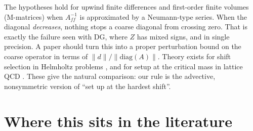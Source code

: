 \documentclass[11pt,a4paper]{article}
\newcommand{\Aff}{A_{ff}}
\begin{document}
\smallskip
The hypotheses hold for upwind finite differences and first-order finite volumes (M-matrices) when $\Aff^{-1}$ is approximated by a Neumann-type series. When the diagonal \emph{decreases}, nothing stops a coarse diagonal from crossing zero. That is exactly the failure seen with DG, where $Z$ has mixed signs, and in single precision. A paper should turn this into a proper perturbation bound on the coarse operator in terms of $\|d\|/\|\mathrm{diag}(A)\|$. Theory exists for shift selection in Helmholtz problems \cite{GGS15,CG17}, and for setup at the critical mass in lattice QCD \cite{Babich10}. These give the natural comparison: our rule is the advective, nonsymmetric version of ``set up at the hardest shift''.

\section{Where this sits in the literature}
\end{document}
